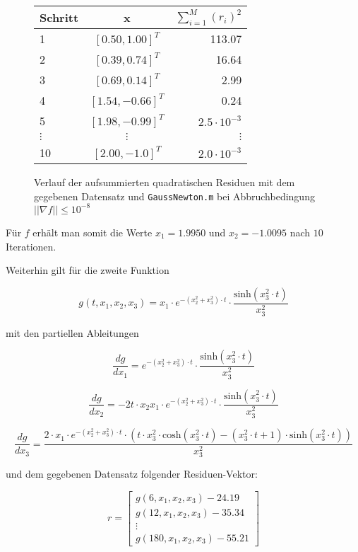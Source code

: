 \documentclass[a4paper, 12pt]{report}
\begin{document}
\begin{figure}[H]
  \centering
  \def\arraystretch{1.25}
  \begin{tabular}{l|c|r}
    \hline
    \textbf{Schritt} & \textbf{x} & \textbf{$\sum_{i=1}^M (r_i)^2$}\\
    \hline
    1 & $[0.50, 1.00]^T$ & 113.07\\
    2 & $[0.39, 0.74]^T$ & 16.64\\
    3 & $[0.69, 0.14]^T$ & 2.99\\
    4 & $[1.54, -0.66]^T$ & 0.24\\
    5 & $[1.98, -0.99]^T$ & $2.5\cdot 10^{-3}$\\
    $\vdots$ & $\vdots$ & $\vdots$\\
    10 & $[2.00, -1.0]^T$ & $2.0\cdot 10^{-3}$\\
    \hline
  \end{tabular}
  \caption{Verlauf der aufsummierten quadratischen Residuen mit dem gegebenen Datensatz und
  \lstinline[basicstyle=\ttfamily\color{black}]|GaussNewton.m| bei Abbruchbedingung $||\nabla f|| \leq 10^{-8}$ }
\end{figure}

Für $f$ erhält man somit die Werte $x_1 = 1.9950$ und $x_2 = -1.0095$ nach $10$ Iterationen.\par

Weiterhin gilt für die zweite Funktion

$$g(t, x_1, x_2, x_3) = x_1\cdot e^{-(x_2^2 + x_3^2)\cdot t}\cdot \frac{\text{sinh}(x_3^2\cdot t)}{x_3^2}$$

mit den partiellen Ableitungen

$$\frac{dg}{dx_1} = e^{ -(x_2^2 + x_3^2)\cdot t } \cdot \frac{\text{sinh}( x_3^2 \cdot t) }{ x_3^2 } $$

$$\frac{dg}{dx_2} = - 2t \cdot x_2 x_1 \cdot e^{ - (x_2^2 + x_3^2)\cdot t } \cdot \frac{\text{sinh}( x_3^2 \cdot t )}{ x_3^2} $$

$$\frac{dg}{dx_3} = \frac{2 \cdot x_1 \cdot e^{ -(x_2^2 + x_3^2)\cdot t} \cdot \left( t \cdot x_3^2 \cdot \text{cosh}(x_3^2\cdot t) - (x_3^2\cdot t + 1) \cdot \text{sinh}(x_3^2 \cdot t) \right) }{x_3^2} $$

und dem gegebenen Datensatz folgender Residuen-Vektor:

$$r = \begin{bmatrix} g(6, x_1, x_2, x_3) - 24.19\\ g(12, x_1, x_2, x_3) - 35.34\\ \vdots \\ g(180, x_1, x_2, x_3) - 55.21 \end{bmatrix}$$
\end{document}

